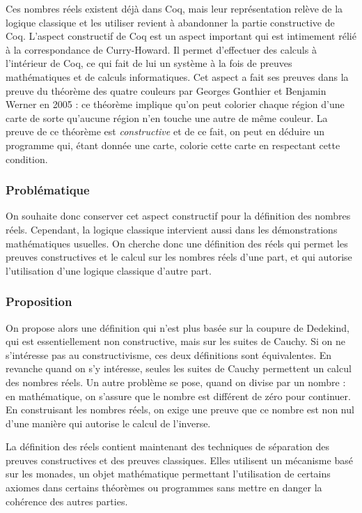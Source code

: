 \documentclass[11pt]{article}
\begin{document}
Ces nombres réels existent déjà dans Coq, mais leur représentation relève de la logique classique et les utiliser revient à abandonner la partie constructive de Coq. L'aspect constructif de Coq est un aspect important qui est intimement rélié à la correspondance de Curry-Howard. Il permet d'effectuer des calculs à l'intérieur de Coq, ce qui fait de lui un système à la fois de preuves mathématiques et de calculs informatiques. Cet aspect a fait ses preuves dans la preuve du théorème des quatre couleurs par Georges Gonthier et Benjamin Werner en 2005 : ce théorème implique qu'on peut colorier chaque région d'une carte de sorte qu'aucune région n'en touche une autre de même couleur. La preuve de ce théorème est \emph{constructive} et de ce fait, on peut en déduire un programme qui, étant donnée une carte, colorie cette carte en respectant cette condition.

\subsubsection{Problématique}

On souhaite donc conserver cet aspect constructif pour la définition des nombres réels. Cependant, la logique classique intervient aussi dans les démonstrations mathématiques usuelles. On cherche donc une définition des réels qui permet les preuves constructives et le calcul sur les nombres réels d'une part, et qui autorise l'utilisation d'une logique classique d'autre part.

\subsubsection{Proposition}

On propose alors une définition qui n'est plus basée sur la coupure de Dedekind, qui est essentiellement non constructive, mais sur les suites de Cauchy. Si on ne s'intéresse pas au constructivisme, ces deux définitions sont équivalentes. En revanche quand on s'y intéresse, seules les suites de Cauchy permettent un calcul des nombres réels. Un autre problème se pose, quand on divise par un nombre : en mathématique, on s'assure que le nombre est différent de zéro pour continuer. En construisant les nombres réels, on exige une preuve que ce nombre est non nul d'une manière qui autorise le calcul de l'inverse.

La définition des réels contient maintenant des techniques de séparation des preuves constructives et des preuves classiques. Elles utilisent un mécanisme basé sur les monades, un objet mathématique permettant l'utilisation de certains axiomes dans certains théorèmes ou programmes sans mettre en danger la cohérence des autres parties.
\end{document}
